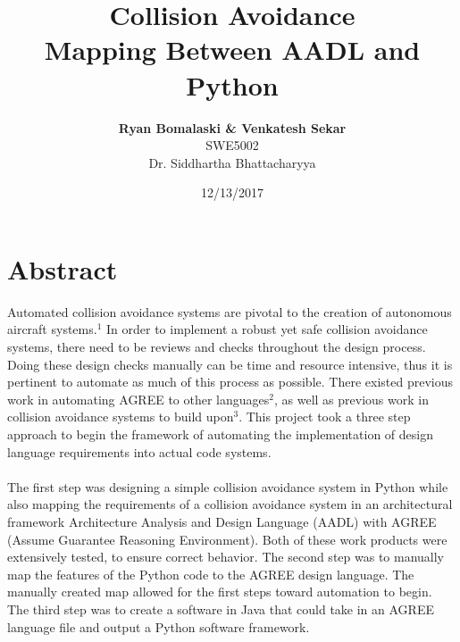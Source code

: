 \documentclass[12pt]{report}
\theoremstyle{plain}
\theoremstyle{definition}
\begin{document}
\title{Collision Avoidance\\
\large Mapping Between AADL and Python}\author{\textbf{ Ryan Bomalaski \& Venkatesh Sekar} \\ SWE5002\\ Dr. Siddhartha Bhattacharyya}
\date{12/13/2017}
\maketitle

\section*{Abstract}
Automated collision avoidance systems are pivotal to the creation of autonomous aircraft systems.$^{1}$  In order to implement a robust yet safe collision avoidance systems, there need to be reviews and checks throughout the design process.  Doing these design checks manually can be time and resource intensive, thus it is pertinent to automate as much of this process as possible.  There existed previous work in automating AGREE to other languages$^{2}$, as well as previous work in collision avoidance systems to build upon$^{3}$.  This project took a three step approach to begin the framework of automating the implementation of design language requirements into actual code systems.  \\
\\
The first step was designing a simple collision avoidance system in Python while also mapping the requirements of a collision avoidance system in an architectural framework Architecture Analysis and Design Language (AADL) with AGREE (Assume Guarantee Reasoning Environment). Both of these work products were extensively tested, to ensure correct behavior.  The second step was to manually map the features of the Python code to the AGREE design language.  The manually created map allowed for the first steps toward automation to begin. The third step was to create a software in Java that could take in an AGREE language file and output a Python software framework.

\end{document}
